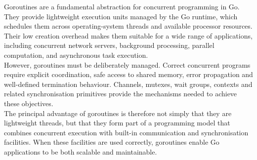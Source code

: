 Goroutines are a fundamental abstraction for concurrent programming in Go. They provide lightweight execution units managed by the Go runtime, which schedules them across operating-system threads and available processor resources. Their low creation overhead makes them suitable for a wide range of applications, including concurrent network servers, background processing, parallel computation, and asynchronous task execution.\\

However, goroutines must be deliberately managed. Correct concurrent programs require explicit coordination, safe access to shared memory, error propagation and well-defined termination behaviour. Channels, mutexes, wait groups, contexts and related synchronisation primitives provide the mechanisms needed to achieve these objectives.\\

The principal advantage of goroutines is therefore not simply that they are lightweight threads, but that they form part of a programming model that combines concurrent execution with built-in communication and synchronisation facilities. When these facilities are used correctly, goroutines enable Go applications to be both scalable and maintainable.